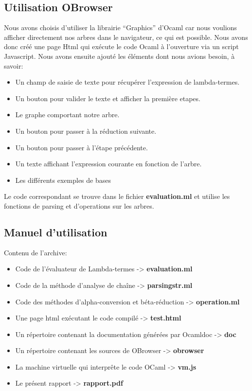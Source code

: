 \documentclass[a4paper,11pt,titlepage]{article}
\begin{document}
\subsection{Utilisation OBrowser}

  Nous avons choisis d'utiliser la librairie ``Graphics'' d'Ocaml car nous voulions afficher directement nos arbres dans le navigateur, ce qui est possible. Nous avons donc créé une page Html qui exécute le code Ocaml à l'ouverture via un script Javascript. Nous avons ensuite ajouté les éléments dont nous avions besoin, à savoir:
\begin{itemize}
 \item Un champ de saisie de texte pour récupérer l'expression de lambda-termes.
 \item Un bouton pour valider le texte et afficher la première etapes.
 \item Le graphe comportant notre arbre.
 \item Un bouton pour passer à la réduction suivante.
 \item Un bouton pour passer à l'étape précédente.
 \item Un texte affichant l'expression courante en fonction de l'arbre.
 \item Les différents exemples de bases\\
\end{itemize}

  Le code correspondant se trouve dans le fichier \textbf{evaluation.ml} et utilise les fonctions de parsing et d'operations sur les arbres.


\subsection{Manuel d'utilisation}

  Contenu de l'archive:
\begin{itemize}
 \item Code de l'évaluateur de Lambda-termes  -> \textbf{evaluation.ml}
 \item Code de la méthode d'analyse de chaîne -> \textbf{parsingstr.ml}
 \item Code des méthodes d'alpha-conversion et béta-réduction -> \textbf{operation.ml}
 \item Une page html exécutant le code compilé -> \textbf{test.html}
 \item Un répertoire contenant la documentation générées par Ocamldoc -> \textbf{doc}
 \item Un répertoire contenant les sources de OBrowser -> \textbf{obrowser}
 \item La machine virtuelle qui interprête le code OCaml -> \textbf{vm.js}
 \item Le présent rapport -> \textbf{rapport.pdf}\\
\end{itemize}
\end{document}
